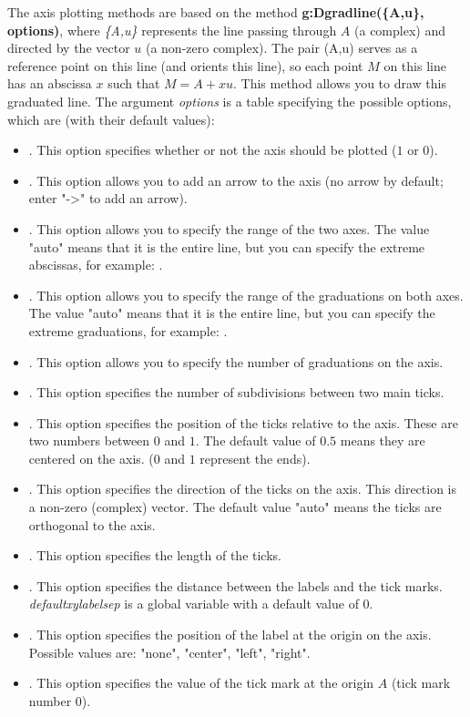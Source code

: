 The axis plotting methods are based on the method \textbf{g:Dgradline(\{A,u\}, options)}, where \emph{\{A,u\}} represents the line passing through $A$ (a complex) and directed by the vector $u$ (a non-zero complex). The pair (A,u) serves as a reference point on this line (and orients this line), so each point $M$ on this line has an abscissa $x$ such that $M=A+xu$. This method allows you to draw this graduated line. The argument \emph{options} is a table specifying the possible options, which are (with their default values):
\begin{itemize}
    \item {}. This option specifies whether or not the axis should be plotted ($1$ or $0$).     \item {}. This option allows you to add an arrow to the axis (no arrow by default; enter "->" to add an arrow).
    \item {}. This option allows you to specify the range of the two axes. The value "auto" means that it is the entire line, but you can specify the extreme abscissas, for example: .
    \item {}. This option allows you to specify the range of the graduations on both axes. The value "auto" means that it is the entire line, but you can specify the extreme graduations, for example: .
    \item {}. This option allows you to specify the number of graduations on the axis.
    \item {}. This option specifies the number of subdivisions between two main ticks.
    \item {}. This option specifies the position of the ticks relative to the axis. These are two numbers between $0$ and $1$. The default value of $0.5$ means they are centered on the axis. ($0$ and $1$ represent the ends).
    \item {}. This option specifies the direction of the ticks on the axis. This direction is a non-zero (complex) vector. The default value "auto" means the ticks are orthogonal to the axis.
    \item {}. This option specifies the length of the ticks.
    \item {}. This option specifies the distance between the labels and the tick marks. \emph{defaultxylabelsep} is a global variable with a default value of $0$.
    \item {}. This option specifies the position of the label at the origin on the axis. Possible values ​​are: "none", "center", "left", "right".
    \item {}. This option specifies the value of the tick mark at the origin $A$ (tick mark number $0$).
    

\end{itemize}

